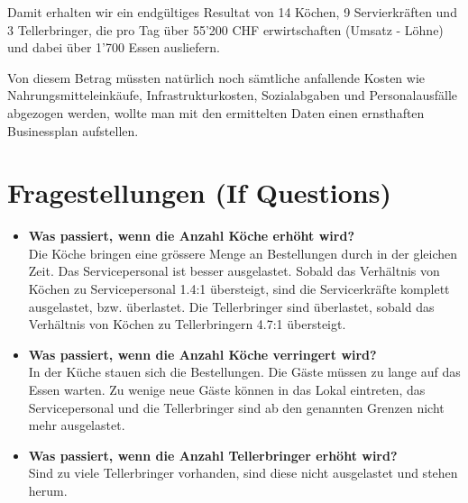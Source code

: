 \documentclass[ngerman,a4paper,12pt]{scrreprt}
\begin{document}
			Damit erhalten wir ein endgültiges Resultat von 14 Köchen, 9 Servierkräften und 3 Tellerbringer, die pro Tag über 55'200 CHF erwirtschaften (Umsatz - Löhne) und dabei über 1'700 Essen ausliefern. 
			
			Von diesem Betrag müssten natürlich noch sämtliche anfallende Kosten wie Nahrungsmitteleinkäufe, Infrastrukturkosten, Sozialabgaben und Personalausfälle abgezogen werden, wollte man mit den ermittelten Daten einen ernsthaften Businessplan aufstellen.

	\section{Fragestellungen (If Questions)}
		\begin{itemize}
			\item \textbf{Was passiert, wenn die Anzahl Köche erhöht wird?} \\
				Die Köche bringen eine grössere Menge an Bestellungen durch in der gleichen Zeit. Das Servicepersonal ist besser ausgelastet. Sobald das Verhältnis von Köchen zu Servicepersonal 1.4:1 übersteigt, sind die Servicerkräfte komplett ausgelastet, bzw. überlastet. Die Tellerbringer sind überlastet, sobald das Verhältnis von Köchen zu Tellerbringern 4.7:1 übersteigt.
			\item \textbf{Was passiert, wenn die Anzahl Köche verringert wird?} \\
				In der Küche stauen sich die Bestellungen. Die Gäste müssen zu lange auf das Essen warten. Zu wenige neue Gäste können in das Lokal eintreten, das Servicepersonal und die Tellerbringer sind ab den genannten Grenzen nicht mehr ausgelastet.
			\item \textbf{Was passiert, wenn die Anzahl Tellerbringer erhöht wird?}\\
				Sind zu viele Tellerbringer vorhanden, sind diese nicht ausgelastet und stehen herum.
				

\end{itemize}
\end{document}
